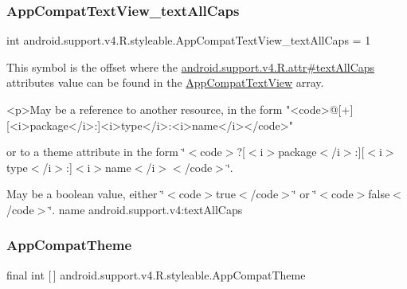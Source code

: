 \subsubsection{\texorpdfstring{App\+Compat\+Text\+View\+\_\+text\+All\+Caps}{AppCompatTextView\_textAllCaps}}
{\footnotesize\ttfamily int android.\+support.\+v4.\+R.\+styleable.\+App\+Compat\+Text\+View\+\_\+text\+All\+Caps = 1\hspace{0.3cm}{\ttfamily [static]}}

This symbol is the offset where the \hyperlink{classandroid_1_1support_1_1v4_1_1R_1_1attr_af49e1396fa93fb3c916d95b6b825adf7}{android.\+support.\+v4.\+R.\+attr\#text\+All\+Caps} attribute\textquotesingle{}s value can be found in the \hyperlink{classandroid_1_1support_1_1v4_1_1R_1_1styleable_a88f80fd07175f06b735411ca091754c2}{App\+Compat\+Text\+View} array.

\begin{DoxyVerb}      <p>May be a reference to another resource, in the form "<code>@[+][<i>package</i>:]<i>type</i>:<i>name</i></code>"
\end{DoxyVerb}
 or to a theme attribute in the form \char`\"{}$<$code$>$?\mbox{[}$<$i$>$package$<$/i$>$\+:\mbox{]}\mbox{[}$<$i$>$type$<$/i$>$\+:\mbox{]}$<$i$>$name$<$/i$>$$<$/code$>$\char`\"{}. 

May be a boolean value, either \char`\"{}$<$code$>$true$<$/code$>$\char`\"{} or \char`\"{}$<$code$>$false$<$/code$>$\char`\"{}.  name android.\+support.\+v4\+:text\+All\+Caps \mbox{\label{classandroid_1_1support_1_1v4_1_1R_1_1styleable_ac07ebbe62ed977f6dcaadc6397840ace}} 
\subsubsection{\texorpdfstring{App\+Compat\+Theme}{AppCompatTheme}}
{\footnotesize\ttfamily final int \mbox{[}$\,$\mbox{]} android.\+support.\+v4.\+R.\+styleable.\+App\+Compat\+Theme\hspace{0.3cm}{\ttfamily [static]}}

